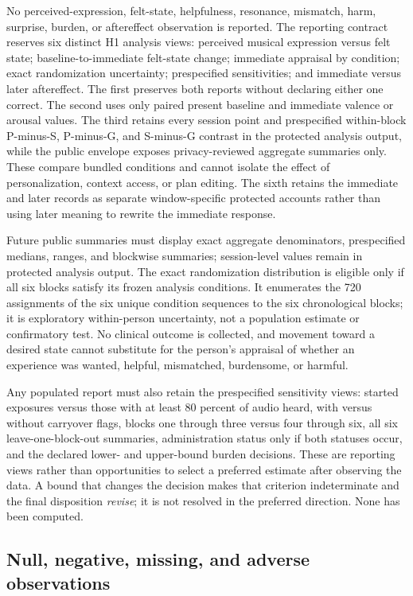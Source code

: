 No perceived-expression, felt-state, helpfulness, resonance, mismatch, harm,
surprise, burden, or aftereffect observation is reported. The reporting contract
reserves six distinct H1 analysis views: perceived musical expression versus
felt state; baseline-to-immediate felt-state change; immediate appraisal by
condition; exact randomization uncertainty; prespecified sensitivities; and
immediate versus later aftereffect. The first preserves both reports without
declaring either one correct. The second uses only paired present baseline and
immediate valence or arousal values. The third retains every session point and
prespecified within-block P-minus-S, P-minus-G, and S-minus-G contrast in the
protected analysis output, while the public envelope exposes privacy-reviewed
aggregate summaries only. These compare bundled conditions and cannot isolate
the effect of personalization, context access, or plan editing. The sixth
retains the immediate and later records as separate window-specific protected
accounts rather than using later meaning to rewrite the immediate response.

Future public summaries must display exact aggregate denominators,
prespecified medians, ranges, and blockwise summaries; session-level values
remain in protected analysis output. The
exact randomization distribution is eligible only if all six blocks satisfy its
frozen analysis conditions. It enumerates the 720 assignments of the six unique
condition sequences to the six chronological blocks; it is exploratory
within-person uncertainty, not a population estimate or confirmatory test. No
clinical outcome is collected, and movement toward a desired state cannot
substitute for the person's appraisal of whether an experience was wanted,
helpful, mismatched, burdensome, or harmful.

Any populated report must also retain the prespecified sensitivity views:
started exposures versus those with at least 80 percent of audio heard, with
versus without carryover flags, blocks one through three versus four through
six, all six leave-one-block-out summaries, administration status only if both
statuses occur, and the declared lower- and
upper-bound burden decisions. These are reporting views rather than
opportunities to select a preferred estimate after observing the data. A bound
that changes the decision makes that criterion indeterminate and the final
disposition \emph{revise}; it is not resolved in the preferred direction. None
has been computed.

\subsection{Null, negative, missing, and adverse observations}
\label{sec:results-nonpositive-observations}

